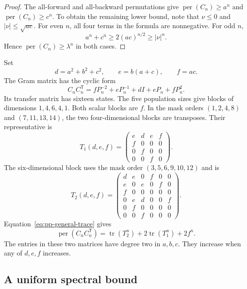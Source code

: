 \documentclass[11pt,a4paper]{article}
\theoremstyle{definition}
\theoremstyle{remark}
\newcommand{\per}{\operatorname{per}}
\newcommand{\T}{\mathsf{T}}
\begin{document}
\begin{proof}
The all-forward and all-backward permutations give
$\per(C_n)\ge a^n$ and $\per(C_n)\ge c^n$.
To obtain the remaining lower bound, note that $\nu\le0$ and
$|\nu|\le\sqrt{ac}$.
For even $n$, all four terms in the formula are nonnegative.
For odd $n$,
\[
a^n+c^n\ge2(ac)^{n/2}\ge|\nu|^n.
\]
Hence $\per(C_n)\ge\lambda^n$ in both cases.
\end{proof}

Set
\begin{equation}\label{eq:pp-def}
d=a^2+b^2+c^2,\qquad e=b(a+c),\qquad f=ac.
\end{equation}
The Gram matrix has the cyclic form
\[
C_nC_n^\T=fP_n^{-2}+eP_n^{-1}+dI+eP_n+fP_n^2.
\]
Its transfer matrix has sixteen states.
The five population sizes give blocks of dimensions $1,4,6,4,1$.
Both scalar blocks are $f$.
In the mask orders $(1,2,4,8)$ and $(7,11,13,14)$, the two four-dimensional blocks are transposes.
Their representative is
\begin{equation}\label{eq:pp-T1}
T_1(d,e,f)=
\begin{pmatrix}
e&d&e&f\\
f&0&0&0\\
0&f&0&0\\
0&0&f&0
\end{pmatrix}.
\end{equation}
The six-dimensional block uses the mask order $(3,5,6,9,10,12)$ and is
\begin{equation}\label{eq:pp-T2}
T_2(d,e,f)=
\begin{pmatrix}
d&e&0&f&0&0\\
e&0&e&0&f&0\\
f&0&0&0&0&0\\
0&e&d&0&0&f\\
0&f&0&0&0&0\\
0&0&f&0&0&0
\end{pmatrix}.
\end{equation}
Equation~\eqref{eq:pp-general-trace} gives
\begin{equation}\label{eq:pp-gram-trace}
\per(C_nC_n^\T)
=\operatorname{tr}(T_2^n)+2\operatorname{tr}(T_1^n)+2f^n.
\end{equation}
The entries in these two matrices have degree two in $a,b,c$.
They increase when any of $d,e,f$ increases.

\subsection{A uniform spectral bound}
\end{document}
